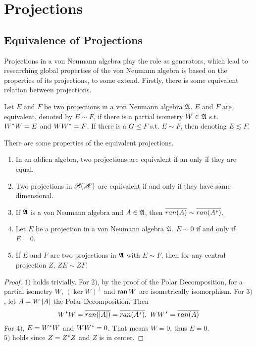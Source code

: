 \section{Projections}

\subsection{Equivalence of Projections}

Projections in a von Neumann algebra play the role as generators, which lead to researching global properties of the von Neumann algebra is based on the properties of its projections, to some extend. Firstly, there is some equivalent relation between projections.

\begin{defn}
	Let $E$ and $F$ be two projections in a von Neumann algebra $\mathfrak{A}$. $E$ and $F$ are equivalent, denoted by $E \sim F$, if there is a partial isometry $W \in \mathfrak{A}$ s.t. $W^{*}W = E$ and $WW^{*} = F$. If there is a $G \leqslant F$ s.t. $E \sim F$, then denoting $E \lesssim F$.
\end{defn}

There are some properties of the equivalent projections.

\begin{prop}
	\begin{enumerate}[label=\arabic*)]
		\item In an ablien algebra, two projections are equivalent if an only if they are equal. 
		\item Two projections in $\mathscr{B(H)}$ are equivalent if and only if they have same dimensional.
		\item If $\mathfrak{A}$ is a von Neumann algebra and $A \in \mathfrak{A}$, then $\overline{ran(A)} \sim \overline{ran(A^{*})}$.
		\item Let $E$ be a projection in a von Neumann algebra $\mathfrak{A}$. $E \sim 0$ if and only if $E = 0$.
		\item If $E$ and $F$ are two projections in $\mathfrak{A}$ with $E \sim F$, then for any central projection $Z$, $ZE \sim ZF$.
	\end{enumerate}
\end{prop}
\begin{proof}
	$1)$ holds trivially. For $2)$, by the proof of the Polar Decomposition, for a partial isometry $W$, $(\ker{W})^{\bot}$ and $\operatorname{ran}{W}$ are isometrically isomorphism. For $3)$, let $A = W\left\lvert A\right\lvert$ the Polar Decomposition. Then
	\begin{equation*}
		W^{*}W = \overline{ran(\left\lvert A\right\lvert)} = \overline{ran(A^{*})},~ W W^{*} = \overline{ran(A)}
	\end{equation*}
	For $4)$, $E = W^{*}W$ and $WW^{*} = 0$. That means $W = 0$, thus $ E = 0$. \\
	$5)$ holds since $Z = Z^{*}Z$ and $Z$ is in center.
\end{proof}

